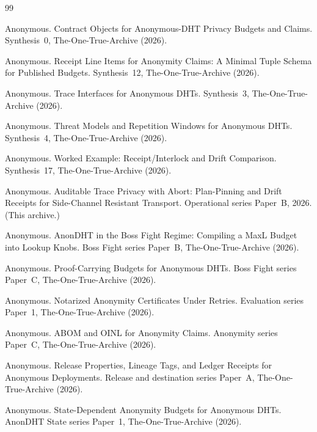 \documentclass[11pt]{article}
\begin{document}
\begin{thebibliography}{99}\small

Anonymous.
\newblock Contract Objects for Anonymous-DHT Privacy Budgets and Claims.
\newblock Synthesis~0, The-One-True-Archive (2026).

Anonymous.
\newblock Receipt Line Items for Anonymity Claims: A Minimal Tuple Schema for Published Budgets.
\newblock Synthesis~12, The-One-True-Archive (2026).

Anonymous.
\newblock Trace Interfaces for Anonymous DHTs.
\newblock Synthesis~3, The-One-True-Archive (2026).

Anonymous.
\newblock Threat Models and Repetition Windows for Anonymous DHTs.
\newblock Synthesis~4, The-One-True-Archive (2026).

Anonymous.
\newblock Worked Example: Receipt/Interlock and Drift Comparison.
\newblock Synthesis~17, The-One-True-Archive (2026).

Anonymous.
\newblock Auditable Trace Privacy with Abort: Plan-Pinning and Drift Receipts for Side-Channel Resistant Transport.
\newblock Operational series Paper~B, 2026. (This archive.)

Anonymous.
\newblock AnonDHT in the Boss Fight Regime: Compiling a MaxL Budget into Lookup Knobs.
\newblock Boss Fight series Paper~B, The-One-True-Archive (2026).

Anonymous.
\newblock Proof-Carrying Budgets for Anonymous DHTs.
\newblock Boss Fight series Paper~C, The-One-True-Archive (2026).

Anonymous.
\newblock Notarized Anonymity Certificates Under Retries.
\newblock Evaluation series Paper~1, The-One-True-Archive (2026).

Anonymous.
\newblock ABOM and OINL for Anonymity Claims.
\newblock Anonymity series Paper~C, The-One-True-Archive (2026).

Anonymous.
\newblock Release Properties, Lineage Tags, and Ledger Receipts for Anonymous Deployments.
\newblock Release and destination series Paper~A, The-One-True-Archive (2026).

Anonymous.
\newblock State-Dependent Anonymity Budgets for Anonymous DHTs.
\newblock AnonDHT State series Paper~1, The-One-True-Archive (2026).


\end{thebibliography}
\end{document}
